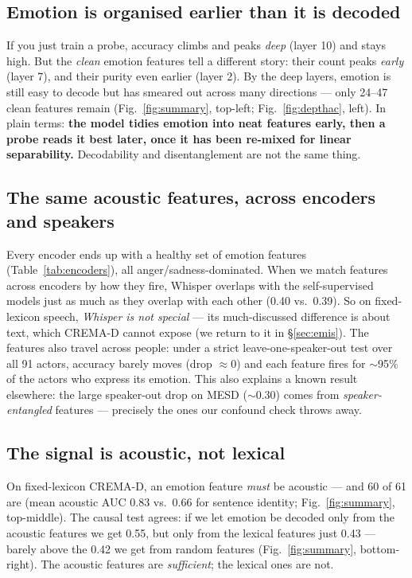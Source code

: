 \documentclass[sigconf,anonymous,nonacm]{acmart}
\begin{document}
\subsection{Emotion is organised earlier than it is decoded}
If you just train a probe, accuracy climbs and peaks \emph{deep} (layer 10) and stays high. But the \emph{clean} emotion features tell a different story: their count peaks \emph{early} (layer 7), and their purity even earlier (layer 2). By the deep layers, emotion is still easy to decode but has smeared out across many directions --- only 24--47 clean features remain (Fig.~\ref{fig:summary}, top-left; Fig.~\ref{fig:depthac}, left). In plain terms: \textbf{the model tidies emotion into neat features early, then a probe reads it best later, once it has been re-mixed for linear separability.} Decodability and disentanglement are not the same thing.

\subsection{The same acoustic features, across encoders and speakers}
Every encoder ends up with a healthy set of emotion features (Table~\ref{tab:encoders}), all anger/sadness-dominated. When we match features across encoders by how they fire, Whisper overlaps with the self-supervised models just as much as they overlap with each other (0.40 vs.\ 0.39). So on fixed-lexicon speech, \emph{Whisper is not special} --- its much-discussed difference is about text, which CREMA-D cannot expose (we return to it in \S\ref{sec:emis}). The features also travel across people: under a strict leave-one-speaker-out test over all 91 actors, accuracy barely moves (drop $\approx 0$) and each feature fires for $\sim$95\% of the actors who express its emotion. This also explains a known result elsewhere: the large speaker-out drop on MESD ($\sim$0.30) comes from \emph{speaker-entangled} features --- precisely the ones our confound check throws away.

\subsection{The signal is acoustic, not lexical}
On fixed-lexicon CREMA-D, an emotion feature \emph{must} be acoustic --- and 60 of 61 are (mean acoustic AUC 0.83 vs.\ 0.66 for sentence identity; Fig.~\ref{fig:summary}, top-middle). The causal test agrees: if we let emotion be decoded only from the acoustic features we get 0.55, but only from the lexical features just 0.43 --- barely above the 0.42 we get from random features (Fig.~\ref{fig:summary}, bottom-right). The acoustic features are \emph{sufficient}; the lexical ones are not.
\end{document}
